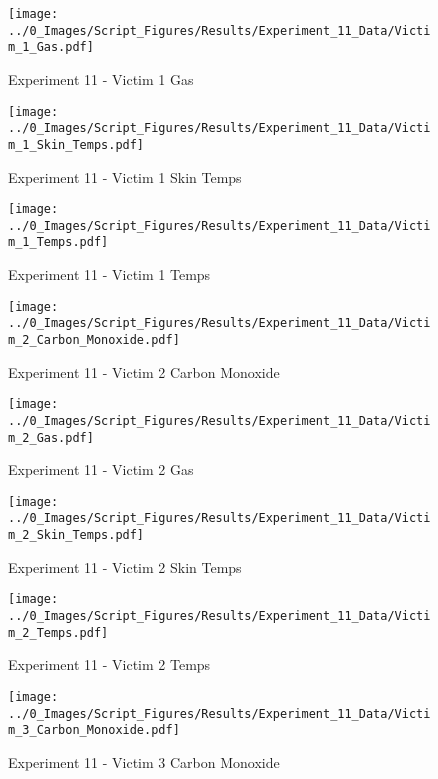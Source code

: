 	\begin{figure}[H]
		\centering
		\texttt{[image: ../0\_Images/Script\_Figures/Results/Experiment\_11\_Data/Victim\_1\_Gas.pdf]}
		\caption[]{Experiment 11 - Victim 1 Gas}
	\end{figure}
 
	\clearpage

	\begin{figure}[H]
		\centering
		\texttt{[image: ../0\_Images/Script\_Figures/Results/Experiment\_11\_Data/Victim\_1\_Skin\_Temps.pdf]}
		\caption[]{Experiment 11 - Victim 1 Skin Temps}
	\end{figure}
 

	\begin{figure}[H]
		\centering
		\texttt{[image: ../0\_Images/Script\_Figures/Results/Experiment\_11\_Data/Victim\_1\_Temps.pdf]}
		\caption[]{Experiment 11 - Victim 1 Temps}
	\end{figure}
 
	\clearpage

	\begin{figure}[H]
		\centering
		\texttt{[image: ../0\_Images/Script\_Figures/Results/Experiment\_11\_Data/Victim\_2\_Carbon\_Monoxide.pdf]}
		\caption[]{Experiment 11 - Victim 2 Carbon Monoxide}
	\end{figure}
 

	\begin{figure}[H]
		\centering
		\texttt{[image: ../0\_Images/Script\_Figures/Results/Experiment\_11\_Data/Victim\_2\_Gas.pdf]}
		\caption[]{Experiment 11 - Victim 2 Gas}
	\end{figure}
 
	\clearpage

	\begin{figure}[H]
		\centering
		\texttt{[image: ../0\_Images/Script\_Figures/Results/Experiment\_11\_Data/Victim\_2\_Skin\_Temps.pdf]}
		\caption[]{Experiment 11 - Victim 2 Skin Temps}
	\end{figure}
 

	\begin{figure}[H]
		\centering
		\texttt{[image: ../0\_Images/Script\_Figures/Results/Experiment\_11\_Data/Victim\_2\_Temps.pdf]}
		\caption[]{Experiment 11 - Victim 2 Temps}
	\end{figure}
 
	\clearpage

	\begin{figure}[H]
		\centering
		\texttt{[image: ../0\_Images/Script\_Figures/Results/Experiment\_11\_Data/Victim\_3\_Carbon\_Monoxide.pdf]}
		\caption[]{Experiment 11 - Victim 3 Carbon Monoxide}
	\end{figure}
 

